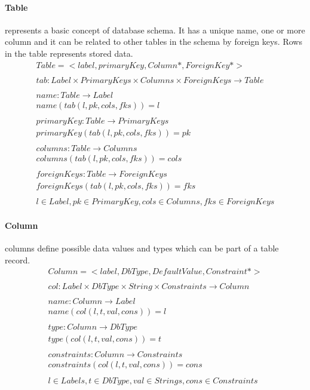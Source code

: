 \documentclass[11pt]{article}
\begin{document}
\paragraph{Table} represents a basic concept of database schema. It has a unique name, one or more column and it can be related to other tables in the schema by foreign keys. Rows in the table represents stored data.
\begin{gather*}
Table = <label, primaryKey, Column*, ForeignKey*>\\ \\
tab : Label \times PrimaryKeys \times Columns \times ForeignKeys \rightarrow Table \\ \\
name : Table \rightarrow Label  \\
name(tab(l, pk, cols, fks)) = l \\ \\
primaryKey : Table \rightarrow PrimaryKeys  \\
primaryKey(tab(l, pk, cols, fks)) = pk \\ \\
columns : Table \rightarrow Columns  \\
columns(tab(l, pk, cols, fks)) = cols \\ \\
foreignKeys : Table \rightarrow ForeignKeys  \\
foreignKeys(tab(l, pk, cols, fks)) = fks \\ \\
l \in Label, pk \in PrimaryKey, cols \in Columns, fks \in ForeignKeys
\end{gather*}

\paragraph{Column} columns define possible data values and types which can be part of a table record.
\begin{gather*}
Column = <label, DbType, DefaultValue, Constraint*> \\ \\
col : Label \times DbType \times String \times Constraints \rightarrow Column \\ \\
name : Column \rightarrow Label  \\
name(col(l, t, val, cons)) = l  \\ \\
type : Column \rightarrow DbType  \\
type(col(l, t, val, cons)) = t  \\ \\
constraints : Column \rightarrow Constraints  \\
constraints(col(l, t, val, cons)) = cons  \\ \\
l \in Labels, t \in DbType, val \in Strings, cons \in Constraints
\end{gather*}
\end{document}
